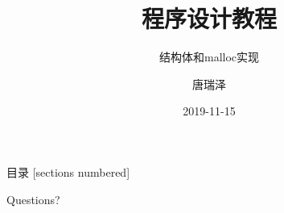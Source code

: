 \documentclass[10pt]{beamer}
\title{程序设计教程}
\subtitle{结构体和malloc实现}
\date{2019-11-15}
\author{唐瑞泽}
\institute{tangruize@smail.nju.edu.cn}
\begin{document}
    \maketitle

    \begin{frame}{目录}
        [sections numbered]
        \tableofcontents[hideallsubsections]
    \end{frame}

    

    

    \begin{frame}[standout]
        Questions?
    \end{frame}
\end{document}
